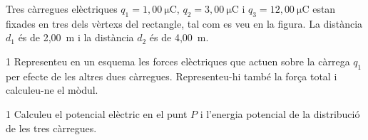 Tres càrregues elèctriques $q_1 = 1,00\ \mathrm{\mu C}$, $q_2 = 3,00\ \mathrm{\mu C}$ i $q_3 = 12,00\ \mathrm{\mu C}$ estan fixades en tres dels vèrtexs del rectangle, tal com es veu en la figura. La distància $d_1$ és de 2,00~m i la distància $d_2$ és de 4,00~m.


\begin{apartat}{1}
Representeu en un esquema les forces elèctriques que actuen sobre la càrrega $q_1$ per efecte de les altres dues càrregues. Representeu-hi també la força total i calculeu-ne el mòdul.
\end{apartat}

\begin{apartat}{1}
Calculeu el potencial elèctric en el punt $P$ i l'energia potencial de la distribució de les tres càrregues.
\end{apartat}

